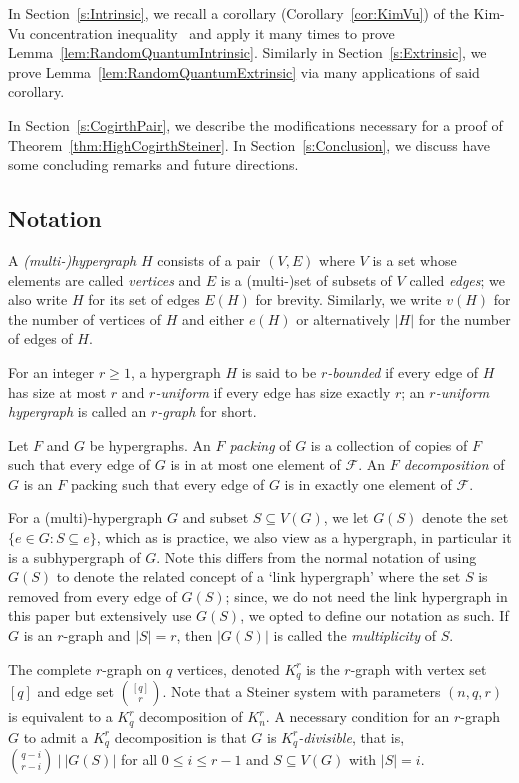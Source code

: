 \documentclass[11pt]{article}
\newcounter{i}
\theoremstyle{plain}
\theoremstyle{plain} %
\theoremstyle{definition}
\begin{document}
In Section~\ref{s:Intrinsic}, we recall a corollary (Corollary~\ref{cor:KimVu}) of the Kim-Vu concentration inequality~\cite{KV00} and apply it many times to prove Lemma~\ref{lem:RandomQuantumIntrinsic}. Similarly in Section~\ref{s:Extrinsic}, we prove Lemma~\ref{lem:RandomQuantumExtrinsic} via many applications of said corollary.

In Section~\ref{s:CogirthPair}, we describe the modifications necessary for a proof of Theorem~\ref{thm:HighCogirthSteiner}. 
In Section~\ref{s:Conclusion}, we discuss have some concluding remarks and future directions.

\subsection{Notation}\label{ss:Notation}

A \emph{(multi-)hypergraph} $H$ consists of a pair $(V, E)$ where $V$ is a set whose elements are called \emph{vertices} and $E$ is a
(multi-)set of subsets of $V$ called \emph{edges}; we also write $H$ for its set of edges $E(H)$ for brevity. Similarly, we write $v(H)$ for the number of vertices of $H$ and either $e(H)$ or alternatively $|H|$ for the number of edges of $H$. 

For an integer $r\ge 1$, a hypergraph $H$ is said to be \emph{$r$-bounded} if every edge of $H$ has size at most $r$ and  \emph{$r$-uniform} if every edge has size exactly $r$; an \emph{$r$-uniform hypergraph} is called an \emph{$r$-graph} for short.

Let $F$ and $G$ be hypergraphs. An \emph{$F$ packing} of $G$ is a collection of copies of $F$ such that every edge of $G$ is in at most one element of $\mathcal{F}$.  An \emph{$F$ decomposition} of $G$ is an $F$ packing such that every edge of $G$ is in exactly one element of $\mathcal{F}$. 

For a (multi)-hypergraph $G$ and subset $S\subseteq V(G)$, we let $G(S)$ denote the set $\{e\in G: S\subseteq e\}$, which as is practice, we also view as a hypergraph, in particular it is a subhypergraph of $G$. Note this differs from the normal notation of using $G(S)$ to denote the related concept of a `link hypergraph' where the set $S$ is removed from every edge of $G(S)$; since, we do not need the link hypergraph in this paper but extensively use $G(S)$, we opted to define our notation as such. If $G$ is an $r$-graph and $|S|=r$, then $|G(S)|$ is called the \emph{multiplicity} of $S$. 

The complete $r$-graph on $q$ vertices, denoted $K_q^r$ is the $r$-graph with vertex set $[q]$ and edge set $\binom{[q]}{r}$. Note that a Steiner system with parameters $(n,q,r)$ is equivalent to a $K_q^r$ decomposition of $K_n^r$. A necessary condition for an $r$-graph $G$ to admit a $K_q^r$ decomposition is that $G$ is \emph{$K_q^r$-divisible}, that is, $\binom{q-i}{r-i}~|~|G(S)|$ for all $0\le i \le r-1$ and $S\subseteq V(G)$ with $|S|=i$. 
\end{document}
